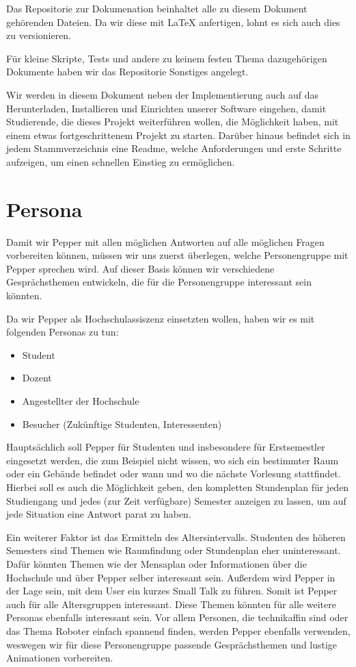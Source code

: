 Das Repositorie zur Dokumenation beinhaltet alle zu diesem Dokument gehörenden Dateien. Da wir diese mit LaTeX anfertigen,
lohnt es sich auch dies zu versionieren.

Für kleine Skripte, Tests und andere zu keinem festen Thema dazugehörigen Dokumente haben wir das Repositorie
\grqq{}Sonstiges\grqq{} angelegt.

Wir werden in diesem Dokument neben der Implementierung auch auf das Herunterladen, Installieren und Einrichten
unserer Software eingehen, damit Studierende, die dieses Projekt weiterführen wollen, die Möglichkeit
haben, mit einem etwas fortgeschrittenem Projekt zu starten. Darüber hinaus befindet sich in jedem Stammverzeichnis
eine Readme, welche Anforderungen und erste Schritte aufzeigen, um einen schnellen Einstieg zu ermöglichen.\\

\section{Persona}
Damit wir Pepper mit allen möglichen Antworten auf alle möglichen Fragen vorbereiten können, müssen wir uns zuerst überlegen, welche Personengruppe mit Pepper sprechen wird. Auf dieser Basis können wir verschiedene Gesprächsthemen entwickeln, die für die Personengruppe interessant sein könnten.

Da wir Pepper als Hochschulassiszenz einsetzten wollen, haben wir es mit folgenden Personas zu tun:
\begin{itemize}
    \item Student
    \item Dozent
    \item Angestellter der Hochschule
    \item Besucher (Zukünftige Studenten, Interessenten)
\end{itemize}

Hauptsächlich soll Pepper für Studenten und insbesondere für Erstsemestler eingesetzt werden, die zum Beispiel nicht wissen, wo sich ein bestimmter Raum oder ein Gebäude befindet oder wann und wo die nächste Vorlesung stattfindet. Hierbei soll es auch die Möglichkeit geben, den kompletten Stundenplan für jeden Studiengang und jedes (zur Zeit verfügbare) Semester anzeigen zu lassen, um auf jede Situation eine Antwort parat zu haben.

Ein weiterer Faktor ist das Ermitteln des Altersintervalls. Studenten des höheren Semesters sind Themen wie Raumfindung oder Stundenplan eher uninteressant. Dafür könnten Themen wie der Mensaplan oder Informationen über die Hochschule und über Pepper selber interessant sein. Außerdem wird Pepper in der Lage sein, mit dem User ein kurzes Small Talk zu führen. Somit ist Pepper auch für alle Altersgruppen interessant. Diese Themen könnten für alle weitere Personas ebenfalls interessant sein. Vor allem Personen, die technikaffin sind oder das Thema Roboter einfach spannend finden, werden Pepper ebenfalls verwenden, weswegen wir für diese Personengruppe passende Gesprächsthemen und lustige Animationen vorbereiten.

